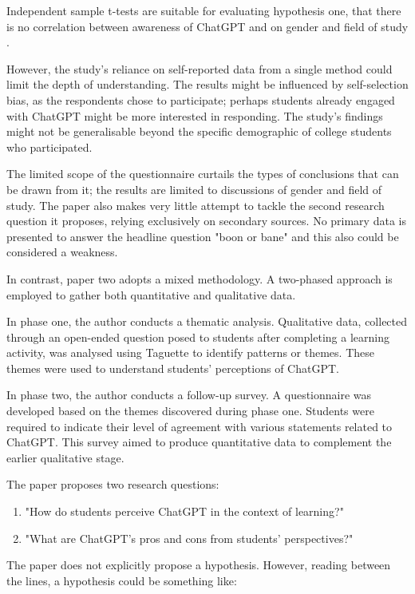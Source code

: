 \documentclass[12pt]{article}
\begin{document}
Independent sample t-tests are suitable for evaluating hypothesis one, that there is no correlation between awareness of ChatGPT and on gender and field of study \cite{kim2019-wu}.

However, the study's reliance on self-reported data from a single method could limit the depth of understanding. The results might be influenced by self-selection bias, as the respondents chose to participate; perhaps students already engaged with ChatGPT might be more interested in responding. The study's findings might not be generalisable beyond the specific demographic of college students who participated.

The limited scope of the questionnaire curtails the types of conclusions that can be drawn from it; the results are limited to discussions of gender and field of study. The paper also makes very little attempt to tackle the second research question it proposes, relying exclusively on secondary sources. No primary data is presented to answer the headline question "boon or bane" and this also could be considered a weakness.

In contrast, paper two adopts a mixed methodology. A two-phased approach is employed to gather both quantitative and qualitative data.

In phase one, the author conducts a thematic analysis. Qualitative data, collected through an open-ended question posed to students after completing a learning activity, was analysed using Taguette \cite{taguette} to identify patterns or themes. These themes were used to understand students' perceptions of ChatGPT.

In phase two, the author conducts a follow-up survey. A questionnaire was developed based on the themes discovered during phase one. Students were required to indicate their level of agreement with various statements related to ChatGPT. This survey aimed to produce quantitative data to complement the earlier qualitative stage.

The paper proposes two research questions:

\begin{enumerate}
    \item "How do students perceive ChatGPT in the context of learning?"
    \item "What are ChatGPT's pros and cons from students' perspectives?" \cite{paper2}
\end{enumerate}

The paper does not explicitly propose a hypothesis. However, reading between the lines, a hypothesis could be something like:
\end{document}
